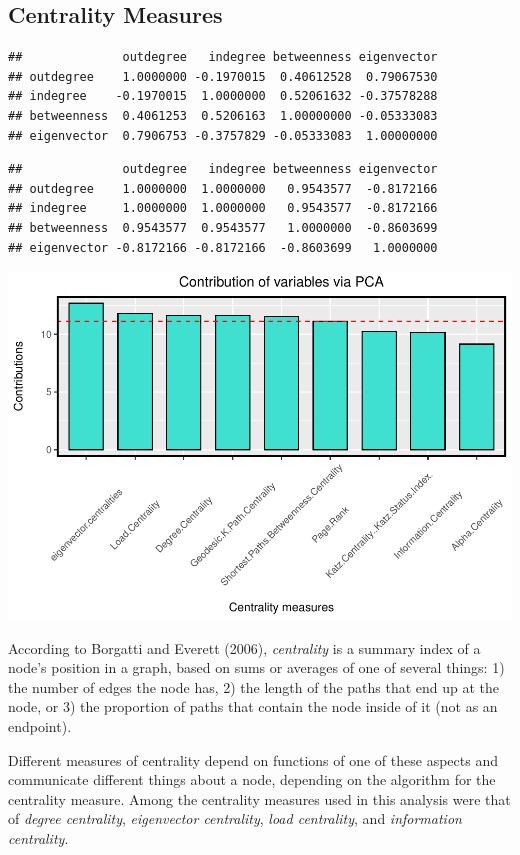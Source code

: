 \documentclass[12pt]{article}
\begin{document}
\hypertarget{centrality-measures}{%
\subsection{Centrality Measures}\label{centrality-measures}}

\begin{verbatim}
##              outdegree   indegree betweenness eigenvector
## outdegree    1.0000000 -0.1970015  0.40612528  0.79067530
## indegree    -0.1970015  1.0000000  0.52061632 -0.37578288
## betweenness  0.4061253  0.5206163  1.00000000 -0.05333083
## eigenvector  0.7906753 -0.3757829 -0.05333083  1.00000000
\end{verbatim}

\begin{verbatim}
##              outdegree   indegree betweenness eigenvector
## outdegree    1.0000000  1.0000000   0.9543577  -0.8172166
## indegree     1.0000000  1.0000000   0.9543577  -0.8172166
## betweenness  0.9543577  0.9543577   1.0000000  -0.8603699
## eigenvector -0.8172166 -0.8172166  -0.8603699   1.0000000
\end{verbatim}

\includegraphics{JStevenRaquel-paper_files/figure-latex/centralities_more-1.pdf}

According to Borgatti and Everett (2006), \emph{centrality} is a summary index of a node's position in a graph, based on sums or averages of one of several things: 1) the number of edges the node has, 2) the length of the paths that end up at the node, or 3) the proportion of paths that contain the node inside of it (not as an endpoint).

Different measures of centrality depend on functions of one of these aspects and communicate different things about a node, depending on the algorithm for the centrality measure. Among the centrality measures used in this analysis were that of \emph{degree centrality}, \emph{eigenvector centrality}, \emph{load centrality}, and \emph{information centrality}.
\end{document}
